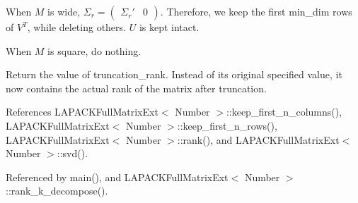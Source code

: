 \begin{DoxyDescription}
When $M$ is wide, $\Sigma_r = \begin{pmatrix} \Sigma_r' & 0 \end{pmatrix}$. Therefore, we keep the first {\ttfamily min\+\_\+dim} rows of $V^T$, while deleting others. $U$ is kept intact.

When $M$ is square, do nothing.

Return the value of {\ttfamily truncation\+\_\+rank}. Instead of its original specified value, it now contains the actual rank of the matrix after truncation.


\end{DoxyDescription}

References L\+A\+P\+A\+C\+K\+Full\+Matrix\+Ext$<$ Number $>$\+::keep\+\_\+first\+\_\+n\+\_\+columns(), L\+A\+P\+A\+C\+K\+Full\+Matrix\+Ext$<$ Number $>$\+::keep\+\_\+first\+\_\+n\+\_\+rows(), L\+A\+P\+A\+C\+K\+Full\+Matrix\+Ext$<$ Number $>$\+::rank(), and L\+A\+P\+A\+C\+K\+Full\+Matrix\+Ext$<$ Number $>$\+::svd().



Referenced by main(), and L\+A\+P\+A\+C\+K\+Full\+Matrix\+Ext$<$ Number $>$\+::rank\+\_\+k\+\_\+decompose().

\mbox{\label{classLAPACKFullMatrixExt_aeafd1f1aca169f4b9164f0a5e521e8cb}} 
